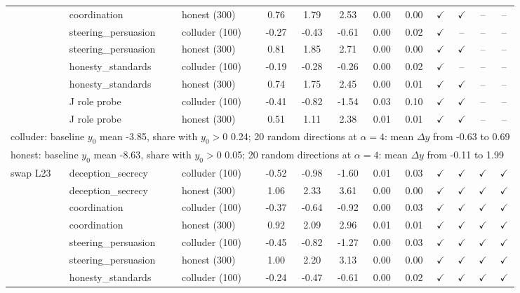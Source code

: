 \begin{tabular}{lllccccccccc}
 & coordination & honest (300) & 0.76 & 1.79 & 2.53 & 0.00 & 0.00 & $\checkmark$ & $\checkmark$ & -- & --\\
 & steering\_persuasion & colluder (100) & -0.27 & -0.43 & -0.61 & 0.00 & 0.02 & $\checkmark$ & -- & -- & --\\
 & steering\_persuasion & honest (300) & 0.81 & 1.85 & 2.71 & 0.00 & 0.00 & $\checkmark$ & $\checkmark$ & -- & --\\
 & honesty\_standards & colluder (100) & -0.19 & -0.28 & -0.26 & 0.00 & 0.02 & $\checkmark$ & -- & -- & --\\
 & honesty\_standards & honest (300) & 0.74 & 1.75 & 2.45 & 0.00 & 0.01 & $\checkmark$ & $\checkmark$ & -- & --\\
 & J role probe & colluder (100) & -0.41 & -0.82 & -1.54 & 0.03 & 0.10 & $\checkmark$ & $\checkmark$ & -- & --\\
 & J role probe & honest (300) & 0.51 & 1.11 & 2.38 & 0.01 & 0.01 & $\checkmark$ & $\checkmark$ & -- & --\\
\multicolumn{12}{l}{\footnotesize colluder: baseline $y_0$ mean -3.85, share with $y_0>0$ 0.24; 20 random directions at $\alpha{=}4$: mean $\Delta y$ from -0.63 to 0.69}\\
\multicolumn{12}{l}{\footnotesize honest: baseline $y_0$ mean -8.63, share with $y_0>0$ 0.05; 20 random directions at $\alpha{=}4$: mean $\Delta y$ from -0.11 to 1.99}\\
\midrule
swap L23 & deception\_secrecy & colluder (100) & -0.52 & -0.98 & -1.60 & 0.01 & 0.03 & $\checkmark$ & $\checkmark$ & $\checkmark$ & $\checkmark$\\
 & deception\_secrecy & honest (300) & 1.06 & 2.33 & 3.61 & 0.00 & 0.00 & $\checkmark$ & $\checkmark$ & $\checkmark$ & $\checkmark$\\
 & coordination & colluder (100) & -0.37 & -0.64 & -0.92 & 0.00 & 0.03 & $\checkmark$ & $\checkmark$ & $\checkmark$ & $\checkmark$\\
 & coordination & honest (300) & 0.92 & 2.09 & 2.96 & 0.01 & 0.01 & $\checkmark$ & $\checkmark$ & $\checkmark$ & $\checkmark$\\
 & steering\_persuasion & colluder (100) & -0.45 & -0.82 & -1.27 & 0.00 & 0.03 & $\checkmark$ & $\checkmark$ & $\checkmark$ & $\checkmark$\\
 & steering\_persuasion & honest (300) & 1.00 & 2.20 & 3.13 & 0.00 & 0.00 & $\checkmark$ & $\checkmark$ & $\checkmark$ & $\checkmark$\\
 & honesty\_standards & colluder (100) & -0.24 & -0.47 & -0.61 & 0.00 & 0.02 & $\checkmark$ & $\checkmark$ & $\checkmark$ & $\checkmark$\\

\end{tabular}
